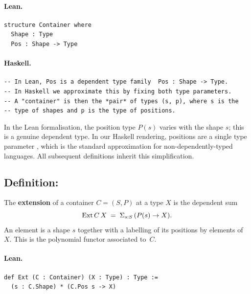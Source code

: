 \documentclass[11pt,a4paper]{article}
\begin{document}
\paragraph{Lean.}
\begin{lstlisting}[style=lean]
structure Container where
  Shape : Type
  Pos : Shape -> Type
\end{lstlisting}

\paragraph{Haskell.}
\begin{lstlisting}[style=haskell]
-- In Lean, Pos is a dependent type family  Pos : Shape -> Type.
-- In Haskell we approximate this by fixing both type parameters.
-- A "container" is then the *pair* of types (s, p), where s is the
-- type of shapes and p is the type of positions.
\end{lstlisting}

\begin{fidelitynote}
In the Lean formalisation, the position type $P(s)$ varies with the shape $s$;
this is a genuine dependent type.  In our Haskell rendering, positions are a
single type parameter , which is the standard approximation for
non-dependently-typed languages.  All subsequent definitions inherit this
simplification.
\end{fidelitynote}


\subsection{Definition: }

\begin{defn}[Extension]
The \textbf{extension} of a container $C = (S, P)$ at a type $X$ is the
dependent sum
\[
  \mathrm{Ext}\,C\,X \;=\; \Sigma_{s : S}\,(P(s) \to X).
\]
An element is a shape $s$ together with a labelling of its positions by
elements of $X$.  This is the polynomial functor associated to~$C$.
\end{defn}

\paragraph{Lean.}
\begin{lstlisting}[style=lean]
def Ext (C : Container) (X : Type) : Type :=
  (s : C.Shape) * (C.Pos s -> X)
\end{lstlisting}
\end{document}

